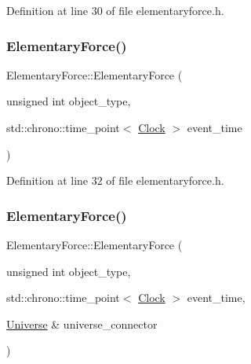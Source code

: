 Definition at line 30 of file elementaryforce.\+h.

\mbox{\label{class_elementary_force_a30f4a2259927de81cf3ef66c495f423c}} 
\subsubsection{\texorpdfstring{Elementary\+Force()}{ElementaryForce()}\hspace{0.1cm}{\footnotesize\ttfamily [3/4]}}
{\footnotesize\ttfamily Elementary\+Force\+::\+Elementary\+Force (\begin{DoxyParamCaption}\item[{unsigned int}]{object\+\_\+type,  }\item[{std\+::chrono\+::time\+\_\+point$<$ \hyperlink{universe_8h_a0ef8d951d1ca5ab3cfaf7ab4c7a6fd80}{Clock} $>$}]{event\+\_\+time }\end{DoxyParamCaption})\hspace{0.3cm}{\ttfamily [inline]}}



Definition at line 32 of file elementaryforce.\+h.

\mbox{\label{class_elementary_force_a1b466cc9aeb317161a7632cb5651a537}} 
\subsubsection{\texorpdfstring{Elementary\+Force()}{ElementaryForce()}\hspace{0.1cm}{\footnotesize\ttfamily [4/4]}}
{\footnotesize\ttfamily Elementary\+Force\+::\+Elementary\+Force (\begin{DoxyParamCaption}\item[{unsigned int}]{object\+\_\+type,  }\item[{std\+::chrono\+::time\+\_\+point$<$ \hyperlink{universe_8h_a0ef8d951d1ca5ab3cfaf7ab4c7a6fd80}{Clock} $>$}]{event\+\_\+time,  }\item[{\hyperlink{class_universe}{Universe} \&}]{universe\+\_\+connector }\end{DoxyParamCaption})\hspace{0.3cm}{\ttfamily [inline]}}



